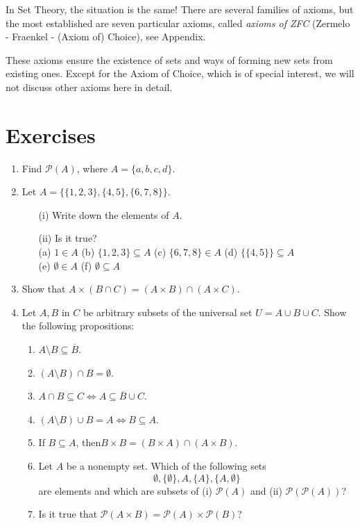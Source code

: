 \documentclass[11pt,paper=b5,footinclude,headinclude]{scrbook} %
\theoremstyle{remark}
\theoremstyle{definition} %
\theoremstyle{theorem} %
\begin{document}
In Set Theory, the situation is the same! There are several families of axioms, but the most established are seven particular axioms, called {\em axioms of ZFC} (Zermelo - Fraenkel - (Axiom of) Choice), see Appendix.

These axioms ensure the existence of sets and ways of forming new sets from existing ones. 
Except for the Axiom of Choice, which is of special interest, we will not discuss other axioms here in detail.

\section{Exercises}



\begin{enumerate}

\item Find $\mathcal{P}(A)$, where $A=\{a,b,c,d\}$.

\item Let $A=\{\{1,2,3\}, \{4,5\}, \{6,7,8\}\}$.
\begin{enumerate}
\item[(i)] Write down the elements of  $A$.
\item[(ii)] Is it true?\\
 (a) $1\in A$ \quad (b) $\{1,2,3\}\subseteq A$ \quad (c)  $\{6,7,8\}\in  A$ \quad  (d)  $\{\{4,5\}\}\subseteq A$\\
  (e) $\emptyset\in A$ \quad(f) $\emptyset\subseteq A$
\end{enumerate}


\item  Show that $A\times (B\cap C) = (A\times B)\cap (A\times C)$.



\item Let $A, B$ in $C$ be arbitrary subsets of the universal set $U= A \cup B \cup C$. Show the following propositions:
\begin{enumerate}
\item  $A\setminus B \subseteq \overline{B}$.
\item  $(A\setminus B)\cap B = \emptyset $.
\item  $A\cap B \subseteq C \Leftrightarrow A\subseteq \overline{B} \cup C$.
\item  $(A\setminus B) \cup B = A \Leftrightarrow B \subseteq A$.
\item  If $B\subseteq A$, then$B\times B = (B\times A)\cap (A\times B)$.
\item Let $A$ be a nonempty set. Which of the following sets 
$$\emptyset,\{\emptyset\}, A, \{A\}, \{A,\emptyset\}$$
are elements and which are subsets of (i) $\mathcal{P}(A)$ and (ii) $\mathcal{P}(\mathcal{P}(A))$?
\item  Is it true that  $\mathcal{P}(A\times B) = \mathcal{P}(A) \times \mathcal{P}(B)$?
\end{enumerate}


\end{enumerate}
\end{document}
